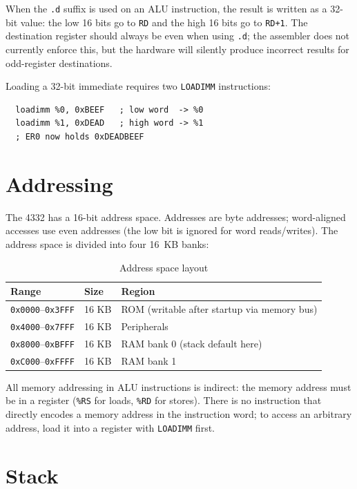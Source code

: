 \documentclass[a4paper,12pt]{report}
\newcommand{\asm}[1]{\texttt{#1}}
\newcommand{\reg}[1]{\texttt{\%#1}}
\begin{document}
When the \asm{.d} suffix is used on an ALU instruction, the result is written as a 32-bit value: the low 16 bits go to \asm{RD} and the high 16 bits go to \asm{RD+1}. The destination register should always be even when using \asm{.d}; the assembler does not currently enforce this, but the hardware will silently produce incorrect results for odd-register destinations.

Loading a 32-bit immediate requires two \asm{LOADIMM} instructions:

\begin{lstlisting}
  loadimm %0, 0xBEEF   ; low word  -> %0
  loadimm %1, 0xDEAD   ; high word -> %1
  ; ER0 now holds 0xDEADBEEF
\end{lstlisting}

\section{Addressing}
\label{sec:addressing}

The 4332 has a 16-bit address space. Addresses are byte addresses; word-aligned accesses use even addresses (the low bit is ignored for word reads/writes). The address space is divided into four 16~KB banks:

\begin{table}[htbp]
\centering
\caption{Address space layout}
\begin{tabularx}{\textwidth}{llX}
    \toprule
    \textbf{Range} & \textbf{Size} & \textbf{Region} \\
    \midrule
    \texttt{0x0000}--\texttt{0x3FFF} & 16 KB & ROM (writable after startup via memory bus) \\
    \texttt{0x4000}--\texttt{0x7FFF} & 16 KB & Peripherals \\
    \texttt{0x8000}--\texttt{0xBFFF} & 16 KB & RAM bank 0 (stack default here) \\
    \texttt{0xC000}--\texttt{0xFFFF} & 16 KB & RAM bank 1 \\
    \bottomrule
\end{tabularx}
\end{table}

All memory addressing in ALU instructions is indirect: the memory address must be in a register (\reg{RS} for loads, \reg{RD} for stores). There is no instruction that directly encodes a memory address in the instruction word; to access an arbitrary address, load it into a register with \asm{LOADIMM} first.

\section{Stack}
\label{sec:stack}
\end{document}
